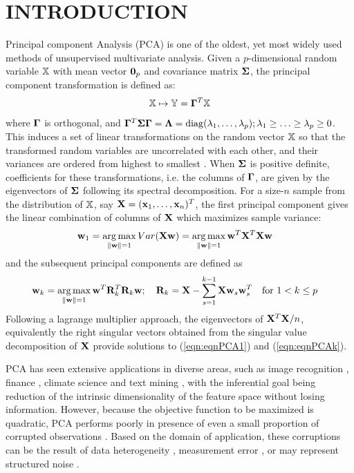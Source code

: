 \section*{\sffamily \Large INTRODUCTION}

Principal component Analysis (PCA) is one of the oldest, yet most widely used methods of unsupervised multivariate analysis. Given a $p$-dimensional random variable ${\mathbb{X}}$ with mean vector ${\bf 0}_p$ and covariance matrix ${\boldsymbol{\Sigma}}$, the principal component transformation is defined as:
%
\begin{align}
{\mathbb{X}} \mapsto {\mathbb{Y}} = {\boldsymbol{\Gamma}}^T {\mathbb{X}}
\end{align}
%
where ${\boldsymbol{\Gamma}}$ is orthogonal, and ${\boldsymbol{\Gamma}}^T {\boldsymbol{\Sigma}} {\boldsymbol{\Gamma}} = {\boldsymbol{\Lambda}} = \operatorname*{diag}( \lambda_1, \ldots, \lambda_p); \lambda_1 \geq \ldots \geq \lambda_p \geq 0$. This induces a set of linear transformations on the random vector ${\mathbb{X}}$ so that the transformed random variables are uncorrelated with each other, and their variances are ordered from highest to smallest \citep{MardiaKentBibby}. When ${\boldsymbol{\Sigma}}$ is positive definite, coefficients for these transformations, i.e. the columns of ${\boldsymbol{\Gamma}}$, are given by the eigenvectors of ${\boldsymbol{\Sigma}}$ following its spectral decomposition. For a size-$n$ sample from the distribution of ${\mathbb{X}}$, say ${\mathbf{X}} = ({\bf{x}}_1, \ldots, {\bf{x}}_n)^T$, the first principal component gives the linear combination of columns of ${\mathbf{X}}$ which maximizes sample variance:
%
\begin{align}\label{eqn:eqnPCA1}
{\bf{w}}_1 &= \operatorname*{arg\,max}_{\| {\bf{w}} \| = 1} Var ({\mathbf{X}} {\bf{w}} ) = \operatorname*{arg\,max}_{\| {\bf{w}} \| = 1} {\bf{w}}^T {\mathbf{X}}^T {\mathbf{X}} {\bf{w}}
\end{align}
%
and the subsequent principal components are defined as
\begin{align}\label{eqn:eqnPCAk}
{\bf{w}}_k &= \operatorname*{arg\,max}_{\| {\bf{w}} \| = 1} {\bf{w}}^T {\mathbf{R}}_k^T {\mathbf{R}}_k {\bf{w}}; \quad {\mathbf{R}}_k = {\mathbf{X}} - \sum_{s=1}^{k-1} {\mathbf{X}} {\bf{w}}_s {\bf{w}}_s^T \quad \text{for } 1< k \leq p
\end{align}
%
Following a lagrange multiplier approach, the eigenvectors of ${\mathbf{X}}^T {\mathbf{X}}/n$, equivalently the right singular vectors obtained from the singular value decomposition of ${\mathbf{X}}$ provide solutions to (\ref{eqn:eqnPCA1}) and (\ref{eqn:eqnPCAk}).

PCA has seen extensive applications in diverse areas, such as image recognition \citep{AlkandariAljaber15}, finance \citep{AlexanderBook}, climate science \citep{WilksBook} and text mining \citep{BerryCastellanos}, with the inferential goal being reduction of the intrinsic dimensionality of the feature space without losing information. However, because the objective function to be maximized is quadratic, PCA performs poorly in presence of even a small proportion of corrupted observations \citep{XuCaramanisMannor13}. Based on the domain of application, these corruptions can be the result of data heterogeneity \citep{SahaEtal16}, measurement error \citep{Bailey12,HelltonThoresen14}, or may represent structured noise \citep{CandesEtal09}.

